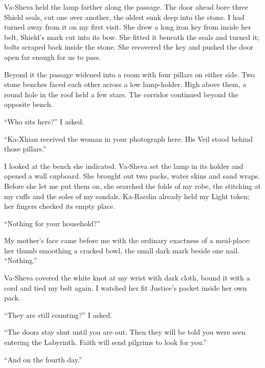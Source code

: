 Va-Sheva held the lamp farther along the passage. The door ahead bore three Shield seals, cut one over another, the oldest sunk deep into the stone. I had turned away from it on my first visit. She drew a long iron key from inside her belt, Shield's mark cut into its bow. She fitted it beneath the seals and turned it; bolts scraped back inside the stone. She recovered the key and pushed the door open far enough for us to pass.\par

Beyond it the passage widened into a room with four pillars on either side. Two stone benches faced each other across a low lamp-holder. High above them, a round hole in the roof held a few stars. The corridor continued beyond the opposite bench.\par

``Who sits here?'' I asked.\par

``Ka-Xhian received the woman in your photograph here. His Veil stood behind those pillars.''\par

I looked at the bench she indicated. Va-Sheva set the lamp in its holder and opened a wall cupboard. She brought out two packs, water skins and sand wraps. Before she let me put them on, she searched the folds of my robe, the stitching at my cuffs and the soles of my sandals. Ka-Raedin already held my Light token; her fingers checked its empty place.\par

``Nothing for your household?''\par

My mother's face came before me with the ordinary exactness of a meal-place: her thumb smoothing a cracked bowl, the small dark mark beside one nail. ``Nothing.''\par

Va-Sheva covered the white knot at my wrist with dark cloth, bound it with a cord and tied my belt again. I watched her fit Justice's packet inside her own pack.\par

``They are still counting?'' I asked.\par

``The doors stay shut until you are out. Then they will be told you were seen entering the Labyrinth. Faith will send pilgrims to look for you.''\par

``And on the fourth day.''\par

